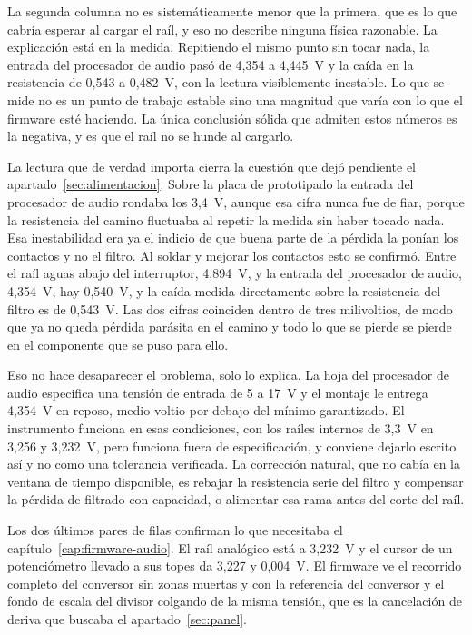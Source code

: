 La segunda columna no es sistemáticamente menor que la primera, que es lo que
cabría esperar al cargar el raíl, y eso no describe ninguna física razonable.
La explicación está en la medida. Repitiendo el mismo punto sin tocar nada, la
entrada del procesador de audio pasó de 4,354 a 4,445~V y la caída en la
resistencia de 0,543 a 0,482~V, con la lectura visiblemente inestable. Lo que
se mide no es un punto de trabajo estable sino una magnitud que varía con lo
que el firmware esté haciendo. La única conclusión sólida que admiten estos
números es la negativa, y es que el raíl no se hunde al cargarlo.

La lectura que de verdad importa cierra la cuestión que dejó pendiente el
apartado~\ref{sec:alimentacion}. Sobre la placa de prototipado la entrada del
procesador de audio rondaba los 3,4~V, aunque esa cifra nunca fue de fiar, porque 
la resistencia del camino fluctuaba al repetir la medida sin haber tocado nada. Esa inestabilidad era ya el indicio de que buena
parte de la pérdida la ponían los contactos y no el filtro. Al soldar y mejorar los contactos
esto se confirmó. Entre el raíl aguas abajo del interruptor, 4,894~V, y la entrada del procesador de
audio, 4,354~V, hay 0,540~V, y la caída medida directamente sobre la
resistencia del filtro es de 0,543~V. Las dos cifras coinciden dentro de tres
milivoltios, de modo que ya no queda pérdida parásita en el camino y todo lo
que se pierde se pierde en el componente que se puso para ello.

Eso no hace desaparecer el problema, solo lo explica. La hoja del procesador de
audio especifica una tensión de entrada de 5 a 17~V \cite{DaisySeed} y el
montaje le entrega 4,354~V en reposo, medio voltio por debajo del mínimo
garantizado. El instrumento funciona en esas condiciones, con los raíles
internos de 3,3~V en 3,256 y 3,232~V, pero funciona fuera de especificación, y
conviene dejarlo escrito así y no como una tolerancia verificada. La corrección
natural, que no cabía en la ventana de tiempo disponible, es rebajar la
resistencia serie del filtro y compensar la pérdida de filtrado con capacidad,
o alimentar esa rama antes del corte del raíl.

Los dos últimos pares de filas confirman lo que necesitaba el
capítulo~\ref{cap:firmware-audio}. El raíl analógico está a 3,232~V y el cursor
de un potenciómetro llevado a sus topes da 3,227 y 0,004~V. El firmware ve el
recorrido completo del conversor sin zonas muertas y con la referencia del
conversor y el fondo de escala del divisor colgando de la misma tensión, que es
la cancelación de deriva que buscaba el apartado~\ref{sec:panel}.

